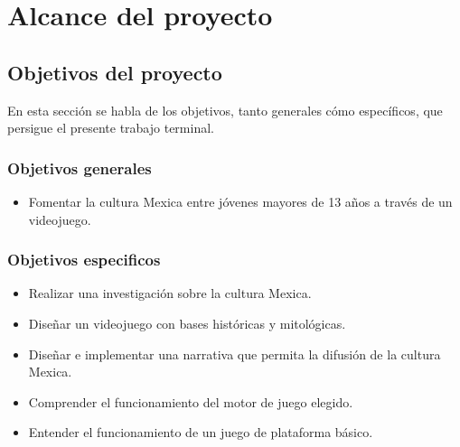 \chapter{Alcance del proyecto}
\section{Objetivos del proyecto} \label{Sec_ObjetivosPro}
En esta sección se habla de los objetivos, tanto generales cómo específicos, que persigue el presente trabajo terminal.
	\subsection{Objetivos generales}\label{Sec_ObjetivosGen}		
		\begin{itemize}
			\item Fomentar la cultura Mexica entre jóvenes mayores de 13 años a través de un videojuego.
		\end{itemize}
		
	\subsection{Objetivos especificos} \label{Sec_ObjetivosEsp}
		\begin{itemize}
			\item Realizar una investigación sobre la cultura Mexica.
			\item Diseñar un videojuego con bases históricas y mitológicas.
			\item Diseñar e implementar una narrativa que permita la difusión de la cultura Mexica. 
			\item Comprender el funcionamiento del motor de juego elegido.
			\item Entender el funcionamiento de un juego de plataforma básico.
		\end{itemize}
		
